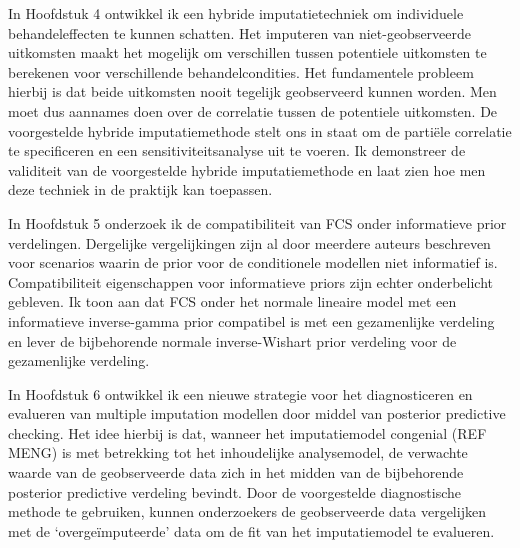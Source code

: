 In Hoofdstuk 4 ontwikkel ik een hybride imputatietechniek om individuele behandeleffecten te kunnen schatten. Het imputeren van niet-geobserveerde uitkomsten maakt het mogelijk om verschillen tussen potentiele uitkomsten te berekenen voor verschillende behandelcondities. Het fundamentele probleem hierbij is dat beide uitkomsten nooit tegelijk geobserveerd kunnen worden. Men moet dus aannames doen over de correlatie tussen de potentiele uitkomsten. De voorgestelde hybride imputatiemethode stelt ons in staat om de partiële correlatie te specificeren en een sensitiviteitsanalyse uit te voeren. Ik demonstreer de validiteit van de voorgestelde hybride imputatiemethode en laat zien hoe men deze techniek in de praktijk kan toepassen. 
 
In Hoofdstuk 5 onderzoek ik de compatibiliteit van FCS onder informatieve prior verdelingen. Dergelijke vergelijkingen zijn al door meerdere auteurs beschreven voor scenarios waarin de prior voor de conditionele modellen niet informatief is. Compatibiliteit eigenschappen voor informatieve priors zijn echter onderbelicht gebleven. Ik toon aan dat FCS onder het normale lineaire model met een informatieve inverse-gamma prior compatibel is met een gezamenlijke verdeling en lever de bijbehorende normale inverse-Wishart prior verdeling voor de gezamenlijke verdeling.  

In Hoofdstuk 6 ontwikkel ik een nieuwe strategie voor het diagnosticeren en evalueren van multiple imputation modellen door middel van posterior predictive checking. Het idee hierbij is dat, wanneer het imputatiemodel congenial (REF MENG) is met betrekking tot het inhoudelijke analysemodel, de verwachte waarde van de geobserveerde data zich in het midden van de bijbehorende posterior predictive verdeling bevindt. Door de voorgestelde diagnostische methode te gebruiken, kunnen onderzoekers de geobserveerde data vergelijken met de ‘overgeïmputeerde’ data om de fit van het imputatiemodel te evalueren. 
 
